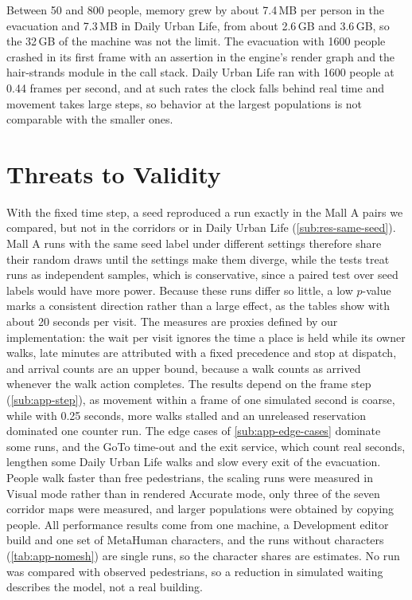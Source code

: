 Between 50 and 800 people, memory grew by about 7.4\,MB per person in the evacuation and 7.3\,MB in Daily Urban Life, from about 2.6\,GB and 3.6\,GB, so the 32\,GB of the machine was not the limit. The evacuation with 1600 people crashed in its first frame with an assertion in the engine's render graph and the hair-strands module in the call stack. Daily Urban Life ran with 1600 people at 0.44 frames per second, and at such rates the clock falls behind real time and movement takes large steps, so behavior at the largest populations is not comparable with the smaller ones.

\section{Threats to Validity}
\label{sec:app-threats}

With the fixed time step, a seed reproduced a run exactly in the Mall A pairs we compared, but not in the corridors or in Daily Urban Life (\cref{sub:res-same-seed}). Mall A runs with the same seed label under different settings therefore share their random draws until the settings make them diverge, while the tests treat runs as independent samples, which is conservative, since a paired test over seed labels would have more power. Because these runs differ so little, a low $p$-value marks a consistent direction rather than a large effect, as the tables show with about 20 seconds per visit. The measures are proxies defined by our implementation: the wait per visit ignores the time a place is held while its owner walks, late minutes are attributed with a fixed precedence and stop at dispatch, and arrival counts are an upper bound, because a walk counts as arrived whenever the walk action completes. The results depend on the frame step (\cref{sub:app-step}), as movement within a frame of one simulated second is coarse, while with 0.25 seconds, more walks stalled and an unreleased reservation dominated one counter run. The edge cases of \cref{sub:app-edge-cases} dominate some runs, and the GoTo time-out and the exit service, which count real seconds, lengthen some Daily Urban Life walks and slow every exit of the evacuation. People walk faster than free pedestrians, the scaling runs were measured in Visual mode rather than in rendered Accurate mode, only three of the seven corridor maps were measured, and larger populations were obtained by copying people. All performance results come from one machine, a Development editor build and one set of MetaHuman characters, and the runs without characters (\cref{tab:app-nomesh}) are single runs, so the character shares are estimates. No run was compared with observed pedestrians, so a reduction in simulated waiting describes the model, not a real building.

